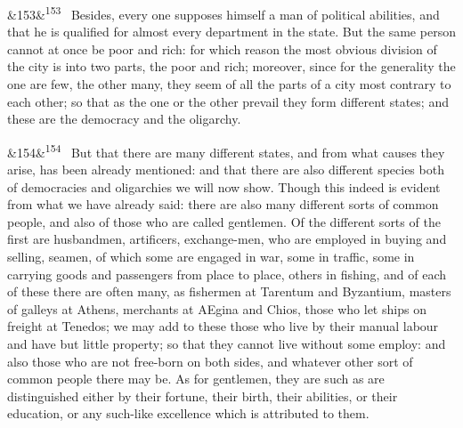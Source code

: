 \documentclass[12pt]{article}
\newcommand{\para}[1][]{\par\noindent\ifx&#1&\else\textsuperscript{\footnotesize #1}~\fi}
\begin{document}
\para[153] Besides, every one supposes himself a man of political abilities, and that he is qualified for almost every department in the state. But the same person cannot at once be poor and rich: for which reason the most obvious division of the city is into two parts, the poor and rich; moreover, since for the generality the one are few, the other many, they seem of all the parts of a city most contrary to each other; so that as the one or the other prevail they form different states; and these are the democracy and the oligarchy.

\para[154] But that there are many different states, and from what causes they arise, has been already mentioned: and that there are also different species both of democracies and oligarchies we will now show. Though this indeed is evident from what we have already said: there are also many different sorts of common people, and also of those who are called gentlemen. Of the different sorts of the first are husbandmen, artificers, exchange-men, who are employed in buying and selling, seamen, of which some are engaged in war, some in traffic, some in carrying goods and passengers from place to place, others in fishing, and of each of these there are often many, as fishermen at Tarentum and Byzantium, masters of galleys at Athens, merchants at AEgina and Chios, those who let ships on freight at Tenedos; we may add to these those who live by their manual labour and have but little property; so that they cannot live without some employ: and also those who are not free-born on both sides, and whatever other sort of common people there may be. As for gentlemen, they are such as are distinguished either by their fortune, their birth, their abilities, or their education, or any such-like excellence which is attributed to them.
\end{document}
